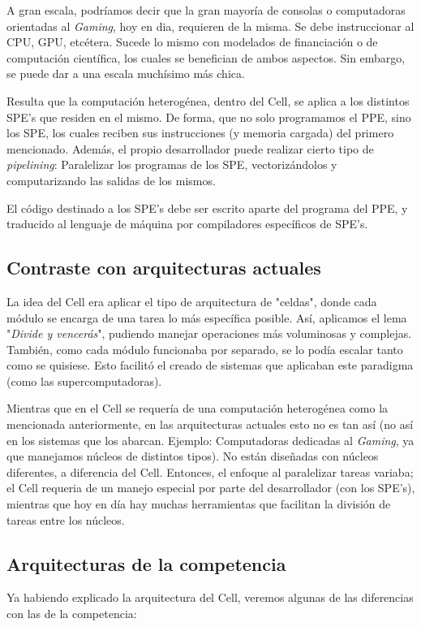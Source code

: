 \documentclass[10pt,compsoc]{IEEEtran}
\begin{document}
	A gran escala, podríamos decir que la gran mayoría de consolas o computadoras orientadas al \textit{Gaming}, hoy en dia, requieren de la misma. Se debe instruccionar al CPU, GPU, etcétera. Sucede lo mismo con modelados de financiación o de computación científica, los cuales se benefician de ambos aspectos. Sin embargo, se puede dar a una escala muchísimo más chica.\newline
	
	 Resulta que la computación heterogénea, dentro del Cell, se aplica a los distintos SPE's que residen en el mismo. De forma, que no solo programamos el PPE, sino los SPE, los cuales reciben sus instrucciones (y memoria cargada) del primero mencionado. Además, el propio desarrollador puede realizar cierto tipo de \textit{pipelining}: Paralelizar los programas de los SPE, vectorizándolos y computarizando las salidas de los mismos.\newline
	 
	 El código destinado a los SPE's debe ser escrito aparte del programa del PPE, y traducido al lenguaje de máquina por compiladores específicos de SPE's.
	
	\subsection{Contraste con arquitecturas actuales}
	\noindent La idea del Cell era aplicar el tipo de arquitectura de "celdas", donde cada módulo se encarga de una tarea lo más específica posible. Así, aplicamos el lema "\textit{Divide y vencerás}", pudiendo manejar operaciones más voluminosas y complejas. También, como cada módulo funcionaba por separado, se lo podía escalar tanto como se quisiese. Esto facilitó el creado de sistemas que aplicaban este paradigma (como las supercomputadoras).\newline
	
	 Mientras que en el Cell se requería de una computación heterogénea como la mencionada anteriormente, en las arquitecturas actuales esto no es tan así (no así en los sistemas que los abarcan. Ejemplo: Computadoras dedicadas al \textit{Gaming}, ya que manejamos núcleos de distintos tipos). No están diseñadas con núcleos diferentes, a diferencia del Cell. Entonces, el enfoque al paralelizar tareas variaba; el Cell requeria de un manejo especial por parte del desarrollador (con los SPE's), mientras que hoy en día hay muchas herramientas que facilitan la división de tareas entre los núcleos.
	
	\subsection{Arquitecturas de la competencia}%
	\noindent Ya habiendo explicado la arquitectura del Cell, veremos algunas de las diferencias con las de la competencia:
	
\end{document}
